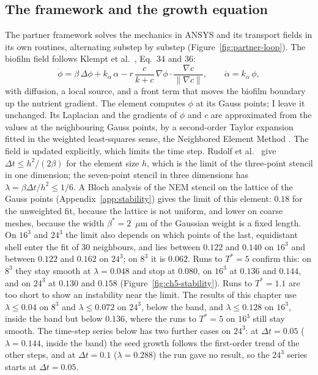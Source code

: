 \subsection{The framework and the growth equation}
The partner framework solves the mechanics in ANSYS and its transport fields in
its own routines, alternating substep by substep
(Figure~\ref{fig:partner-loop}). The biofilm field follows Klempt et
al.~\cite{Klempt2024DiffusionDrivenGrowth}, Eq.~34 and 36:
\begin{equation}
  \dot\phi = \beta\,\Delta\phi + k_\alpha\,\alpha
   - r\,\frac{c}{k+c}\,\nabla\phi\cdot\frac{\nabla c}{\|\nabla c\|},
  \qquad \dot\alpha = k_\alpha\,\phi ,
  \label{eq:ch5-field}
\end{equation}
with diffusion, a local source, and a front term that moves the biofilm
boundary up the nutrient gradient. The element computes $\phi$ at its
Gauss points; I leave it unchanged. Its Laplacian and the gradients of
$\phi$ and $c$ are approximated from the values at the neighbouring
Gauss points, by a second-order Taylor expansion fitted in the weighted
least-squares sense, the Neighbored Element Method
\cite{Blaszczyk2022TaylorWLS,Rudolf2025NEM}. The field is updated
explicitly, which limits the time step. Rudolf et al.~\cite{Rudolf2025NEM}
give $\Delta t\le h^2/(2\beta)$ for the element size $h$, which is the limit of
the three-point stencil in one dimension; the seven-point stencil in three
dimensions has $\lambda=\beta\Delta t/h^2\le1/6$. A Bloch analysis of the
NEM stencil on the lattice of the Gauss points
(Appendix~\ref{app:stability}) gives the limit of this element: $0.18$ for the
unweighted fit, because the lattice is not uniform, and lower on coarse
meshes, because the width $\beta^*=2$~$\mu$m of the Gaussian weight is a fixed
length. On $16^3$ and $24^3$ the limit also depends on which points of
the last, equidistant shell enter the fit of $30$ neighbours, and lies
between $0.122$ and $0.140$ on $16^3$ and between $0.122$ and $0.162$ on
$24^3$; on $8^3$ it is $0.062$. Runs to $T^*=5$ confirm this: on $8^3$ they
stay smooth at $\lambda=0.048$ and stop at $0.080$, on $16^3$ at $0.136$ and
$0.144$, and on $24^3$ at $0.130$ and $0.158$ (Figure~\ref{fig:ch5-stability}).
Runs to $T^*=1.1$ are too short to show an instability near the limit. The
results of this chapter use $\lambda\le0.04$ on $8^3$ and $\lambda\le0.072$
on $24^3$, below the band, and $\lambda\le0.128$ on $16^3$, inside the band
but below $0.136$, where the runs to $T^*=5$ on $16^3$ still stay smooth. The
time-step series below has two further cases on $24^3$: at $\Delta t=0.05$
($\lambda=0.144$, inside the band) the seed growth follows the first-order
trend of the other steps, and at $\Delta t=0.1$ ($\lambda=0.288$) the run gave
no result, so the $24^3$ series starts at $\Delta t=0.05$.

